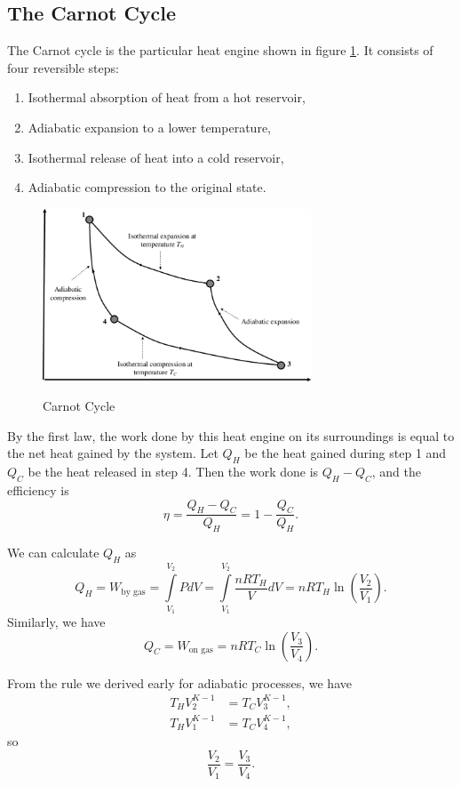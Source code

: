 \subsection{The Carnot Cycle}
The Carnot cycle is the particular heat engine shown in figure \ref{fig:carnot}. It consists of four reversible steps:
\begin{enumerate}
\item Isothermal absorption of heat from a hot reservoir,
\item Adiabatic expansion to a lower temperature,
\item Isothermal release of heat into a cold reservoir,
\item Adiabatic compression to the original state.
\end{enumerate}

\begin{figure}[ht]
\centering
\caption{Carnot Cycle}
\includegraphics[width=8cm]{images/thermo/carnot.png}
\label {fig:carnot}
\end{figure}

By the first law, the work done by this heat engine on its surroundings is equal to the net heat gained by the system. Let $Q_H$ be the heat gained during step 1 and $Q_C$ be the heat released in step 4. Then the work done is $Q_H - Q_C$, and the efficiency is $$\eta = \frac{Q_H-Q_C}{Q_H} = 1-\frac{Q_C}{Q_H}.$$

We can calculate $Q_H$ as $$Q_H = W_{\text{by gas}} = \int \limits_{V_1}^{V_2} P dV = \int  \limits_{V_1}^{V_2} \frac{n R T_H}{V} dV = nR T_H \ln \left(\frac{V_2}{V_1}\right).$$ Similarly, we have $$Q_C = W_{\text{on gas}} = nRT_C \ln \left(\frac{V_3}{V_4}\right).$$

From the rule we derived early for adiabatic processes, we have 
\begin{align*}
T_H V_2^{K-1} &= T_C V_3^{K-1},\\ 
T_H V_1^{K-1} &= T_C V_4^{K-1},
\end{align*}
so 
$$\frac{V_2}{V_1} = \frac{V_3}{V_4}.$$

